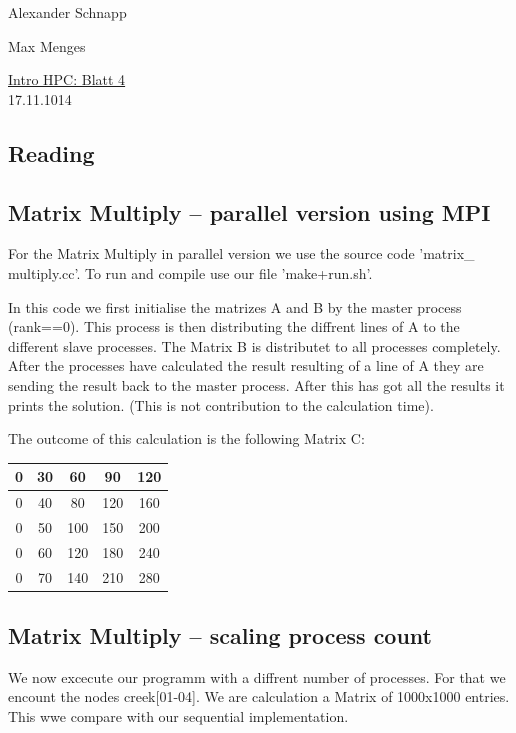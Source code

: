 \documentclass[a4paper,11pt]{scrartcl}
\begin{document}
\hfill Alexander Schnapp

\hfill Max Menges

\begin{center}
\underline{\Huge{Intro HPC: Blatt 4}}\\
\large{17.11.1014}\\
\end{center}

\subsection{Reading}

\subsection{Matrix Multiply -- parallel version using MPI}
For the Matrix Multiply in parallel version we use the source code 'matrix\_ multiply.cc'. To run and compile use our file 'make+run.sh'.

In this code we first initialise the matrizes A and B by the master process (rank==0). This process is then distributing the diffrent lines of A to the different slave processes. The Matrix B is distributet to all processes completely.
After the processes have calculated the result resulting of a line of A they are sending the result back to the master process.
After this has got all the results it prints the solution. (This is not contribution to the calculation time). 

The outcome of this calculation is the following Matrix C:

\begin{tabular}{|c|c|c|c|c|}
\hline 
0 & 30 & 60 & 90 & 120 \\ 
\hline 
0 & 40 & 80 & 120 & 160 \\ 
\hline 
0 & 50 & 100 & 150 & 200 \\ 
\hline 
0 & 60 & 120 & 180 & 240 \\ 
\hline 
0 & 70 & 140 & 210 & 280 \\ 
\hline 
\end{tabular} 



\subsection{Matrix Multiply -- scaling process count}

We now excecute our programm with a diffrent number of processes. For that we encount the nodes creek[01-04]. We are calculation a Matrix of 1000x1000 entries. This wwe compare with our sequential implementation.
\end{document}
